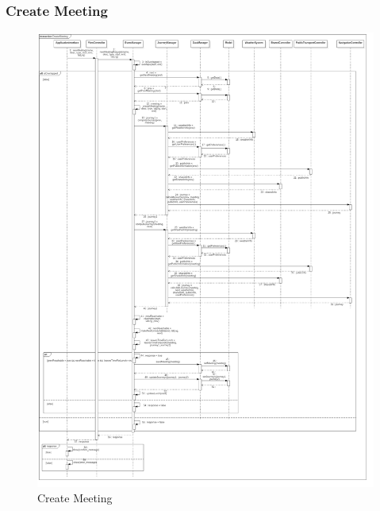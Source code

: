 \subsubsection{Create Meeting}
\begin{figure}[H]
\centering
\includegraphics[scale=0.25]{images/CreateMeeting}
\caption{Create Meeting}

\end{figure}

